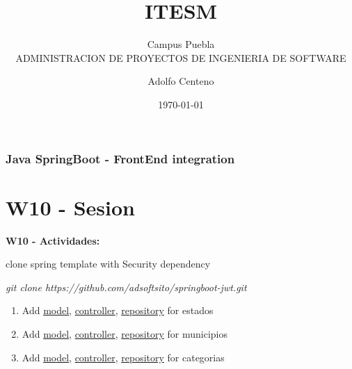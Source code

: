 \documentclass{beamer}
\begin{document}
\title{ITESM}  
\subtitle{Campus Puebla\\ADMINISTRACION DE PROYECTOS DE INGENIERIA DE SOFTWARE
}
\author{Adolfo Centeno}
\date{\today} 


\begin{frame}
\titlepage
\end{frame}

\begin{frame}\frametitle{Java SpringBoot - FrontEnd integration}
\tableofcontents
\end{frame} 


\section{W10 - Sesion }

\begin{frame}

    
\textbf{W10 - Actividades:}


\begin{block}{clone spring template with Security dependency}


 
    \emph{git clone https://github.com/adsoftsito/springboot-jwt.git}
\end{block}

\begin{enumerate}

\item
    Add  
    \href{https://github.com/adsoftsito/maps-api-jwt/blob/master/src/main/java/com/grokonez/jwtauthentication/model/Estado.java}{model}, 
    \href{https://github.com/adsoftsito/maps-api-jwt/blob/master/src/main/java/com/grokonez/jwtauthentication/controller/EstadoController.java}{controller}, 
    \href{https://github.com/adsoftsito/maps-api-jwt/blob/master/src/main/java/com/grokonez/jwtauthentication/repository/EstadoRepository.java}{repository} for estados
    
\item
 Add  
    \href{https://github.com/adsoftsito/maps-api-jwt/blob/master/src/main/java/com/grokonez/jwtauthentication/model/Municipio.java}{model}, 
    \href{https://github.com/adsoftsito/maps-api-jwt/blob/master/src/main/java/com/grokonez/jwtauthentication/controller/MunicipioController.java}{controller}, 
    \href{https://github.com/adsoftsito/maps-api-jwt/blob/master/src/main/java/com/grokonez/jwtauthentication/repository/MunicipioRepository.java}{repository} for municipios
   

\item
 Add  
    \href{https://github.com/adsoftsito/maps-api-jwt/blob/master/src/main/java/com/grokonez/jwtauthentication/model/Categoria.java}{model}, 
    \href{https://github.com/adsoftsito/maps-api-jwt/blob/master/src/main/java/com/grokonez/jwtauthentication/controller/CategoriaController.java}{controller}, 
    \href{https://github.com/adsoftsito/maps-api-jwt/blob/master/src/main/java/com/grokonez/jwtauthentication/repository/CategoriaRepository.java}{repository} for categorias


\end{enumerate}
\end{frame}
\end{document}

